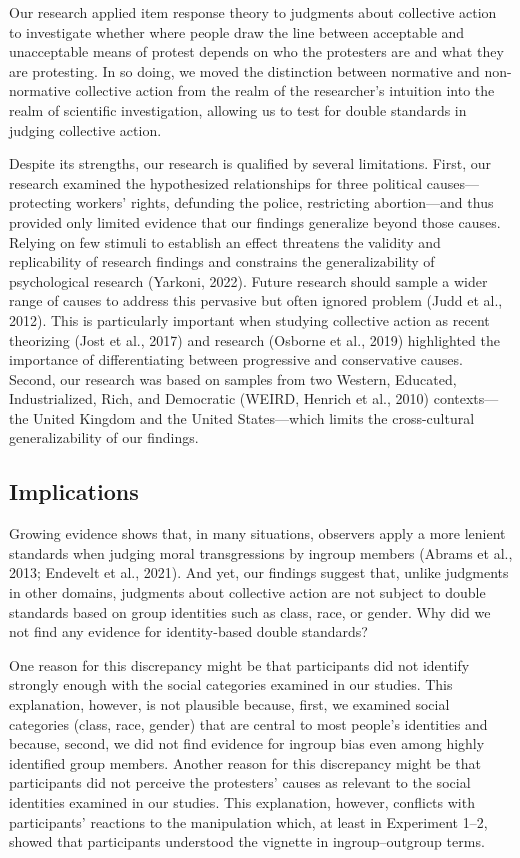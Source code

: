 \documentclass[twocolumn, 11pt, letterpaper]{article}
\begin{document}
Our research applied item response theory to judgments about collective
action to investigate whether where people draw the line between
acceptable and unacceptable means of protest depends on who the
protesters are and what they are protesting. In so doing, we moved the
distinction between normative and non-normative collective action from
the realm of the researcher's intuition into the realm of scientific
investigation, allowing us to test for double standards in judging
collective action.

Despite its strengths, our research is qualified by several limitations.
First, our research examined the hypothesized relationships for three
political causes---protecting workers' rights, defunding the police,
restricting abortion---and thus provided only limited evidence that our
findings generalize beyond those causes. Relying on few stimuli to
establish an effect threatens the validity and replicability of research
findings and constrains the generalizability of psychological research
(Yarkoni, 2022). Future research should sample a wider range of causes
to address this pervasive but often ignored problem (Judd et al., 2012).
This is particularly important when studying collective action as recent
theorizing (Jost et al., 2017) and research (Osborne et al., 2019)
highlighted the importance of differentiating between progressive and
conservative causes. Second, our research was based on samples from two
Western, Educated, Industrialized, Rich, and Democratic (WEIRD, Henrich
et al., 2010) contexts---the United Kingdom and the United
States---which limits the cross-cultural generalizability of our
findings.

\hypertarget{implications}{%
\subsection{Implications}\label{implications}}

Growing evidence shows that, in many situations, observers apply a more
lenient standards when judging moral transgressions by ingroup members
(Abrams et al., 2013; Endevelt et al., 2021). And yet, our findings
suggest that, unlike judgments in other domains, judgments about
collective action are not subject to double standards based on group
identities such as class, race, or gender. Why did we not find any
evidence for identity-based double standards?

One reason for this discrepancy might be that participants did not
identify strongly enough with the social categories examined in our
studies. This explanation, however, is not plausible because, first, we
examined social categories (class, race, gender) that are central to
most people's identities and because, second, we did not find evidence
for ingroup bias even among highly identified group members. Another
reason for this discrepancy might be that participants did not perceive
the protesters' causes as relevant to the social identities examined in
our studies. This explanation, however, conflicts with participants'
reactions to the manipulation which, at least in Experiment 1--2, showed
that participants understood the vignette in ingroup--outgroup terms.
\end{document}
